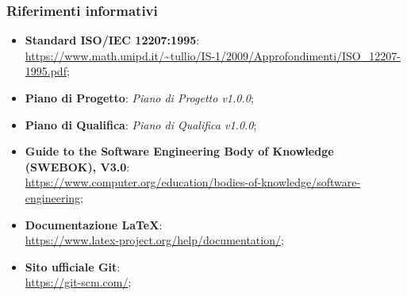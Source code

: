 	
	\subsubsection{Riferimenti informativi}
	\begin{itemize}
		\item \textbf{Standard ISO/IEC 12207:1995}: \\
		\url{https://www.math.unipd.it/~tullio/IS-1/2009/Approfondimenti/ISO_12207-1995.pdf};
		\item \textbf{Piano di Progetto}: \textit{Piano di Progetto v1.0.0};
		\item \textbf{Piano di Qualifica}: \textit{Piano di Qualifica v1.0.0};
		\item \textbf{Guide to the Software Engineering Body of Knowledge (SWEBOK), V3.0}:\\
		\url{https://www.computer.org/education/bodies-of-knowledge/software-engineering};
		\item \textbf{Documentazione LaTeX}: \\
		\url{https://www.latex-project.org/help/documentation/};
		\item \textbf{Sito ufficiale Git}: \\
		\url{https://git-scm.com/};
	\end{itemize}
